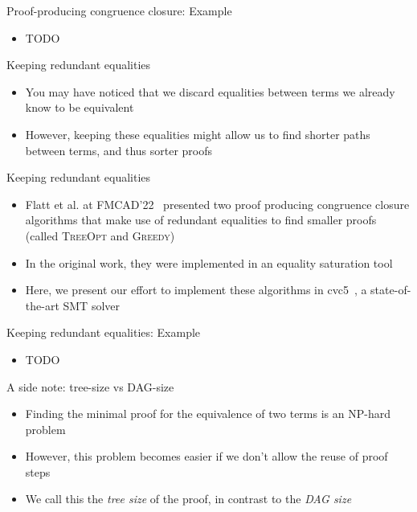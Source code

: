 \documentclass[aspectratio=169]{beamer}
\newcommand\vitem{\vfill\item}
\newcommand\pvitem{\pause\vfill\item}
\begin{document}

\begin{frame}{Proof-producing congruence closure: Example}
  \begin{itemize}
    \item TODO
  \end{itemize}
\end{frame}

\begin{frame}{Keeping redundant equalities}
  \begin{itemize}
    \item You may have noticed that we discard equalities between terms we
    already know to be equivalent
    \vitem However, keeping these equalities might allow us to find shorter
    paths between terms, and thus sorter proofs
  \end{itemize}
\end{frame}

\begin{frame}{Keeping redundant equalities}
  \begin{itemize}
    \item Flatt et al. at FMCAD'22~\cite{flatt2022} presented two proof
    producing congruence closure algorithms that make use of redundant
    equalities to find smaller proofs (called \textsc{TreeOpt} and
    \textsc{Greedy})
    \pvitem In the original work, they were implemented in an equality
    saturation tool
    \pvitem Here, we present our effort to implement these algorithms in
    cvc5~\cite{Barbosa2022-cvc5}, a state-of-the-art SMT solver
  \end{itemize}
\end{frame}

\begin{frame}{Keeping redundant equalities: Example}
  \begin{itemize}
    \item TODO
  \end{itemize}
\end{frame}

\begin{frame}{A side note: tree-size vs DAG-size}
  \begin{itemize}
    \item Finding the minimal proof for the equivalence of two terms is an
    NP-hard problem~\cite{Fellner2017}
    \vitem However, this problem becomes easier if we don't allow the reuse of
    proof steps
    \pvitem We call this the \emph{tree size} of the proof, in contrast to the
    \emph{DAG size}
  \end{itemize}
\end{frame}
\end{document}
